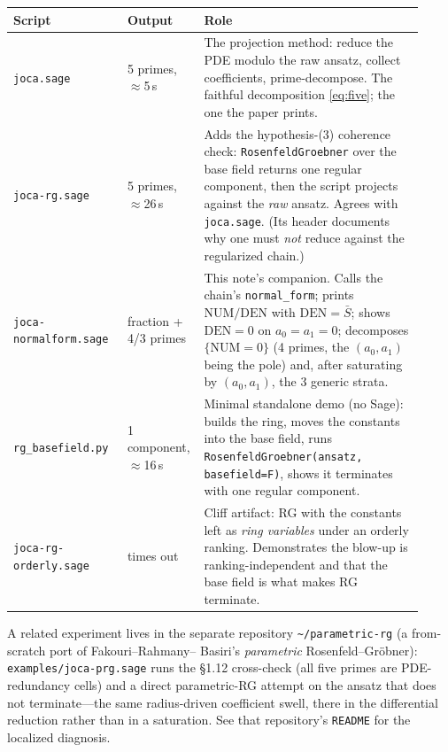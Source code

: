 \documentclass[11pt]{article}
\newcommand{\Sbar}{\bar S}
\newcommand{\code}[1]{\texttt{#1}}
\begin{document}
\begin{center}
\renewcommand{\arraystretch}{1.35}
\begin{tabular}{@{}p{0.27\linewidth}p{0.13\linewidth}p{0.52\linewidth}@{}}
\toprule
\textbf{Script} & \textbf{Output} & \textbf{Role} \\
\midrule
\code{joca.sage} & 5 primes, $\approx$5\,s &
  The projection method: reduce the PDE modulo the raw ansatz, collect
  coefficients, prime-decompose. The faithful decomposition \eqref{eq:five}; the
  one the paper prints. \\
\code{joca-rg.sage} & 5 primes, $\approx$26\,s &
  Adds the hypothesis-(3) coherence check: \code{RosenfeldGroebner} over the
  base field returns one regular component, then the script projects against the
  \emph{raw} ansatz. Agrees with \code{joca.sage}. (Its header documents why one
  must \emph{not} reduce against the regularized chain.) \\
\code{joca-normalform.sage} & fraction \mbox{+} 4/3 primes &
  This note's companion. Calls the chain's \code{normal\_form}; prints
  $\mathrm{NUM}/\mathrm{DEN}$ with $\mathrm{DEN}=\Sbar$; shows $\mathrm{DEN}=0$ on
  $a_0=a_1=0$; decomposes $\{\mathrm{NUM}=0\}$ (4 primes, the $(a_0,a_1)$ being
  the pole) and, after saturating by $(a_0,a_1)$, the 3 generic strata. \\
\code{rg\_basefield.py} & 1 component, $\approx$16\,s &
  Minimal standalone demo (no Sage): builds the ring, moves the constants into
  the base field, runs \code{RosenfeldGroebner(ansatz, basefield=F)}, shows it
  terminates with one regular component. \\
\code{joca-rg-orderly.sage} & times out &
  Cliff artifact: RG with the constants left as \emph{ring variables} under an
  orderly ranking. Demonstrates the blow-up is ranking-independent and that the
  base field is what makes RG terminate. \\
\bottomrule
\end{tabular}
\end{center}

\noindent
A related experiment lives in the separate repository
\code{\textasciitilde/parametric-rg} (a from-scratch port of Fakouri--Rahmany--
Basiri's \emph{parametric} Rosenfeld--Gr\"obner): \code{examples/joca-prg.sage}
runs the §1.12 cross-check (all five primes are PDE-redundancy cells) and a
direct parametric-RG attempt on the ansatz that does not terminate---the same
radius-driven coefficient swell, there in the differential reduction rather than
in a saturation. See that repository's \code{README} for the localized
diagnosis.
\end{document}
